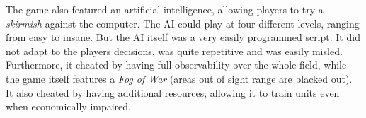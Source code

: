 The game also featured an artificial intelligence, allowing players to try a \emph{skirmish} against the computer. The AI could play at four different levels, ranging from easy to insane. But the AI itself was a very easily programmed script. It did not adapt to the players decisions, was quite repetitive and was easily misled. Furthermore, it cheated by having full observability over the whole field, while the game itself features a \emph{Fog of War} (areas out of sight range are blacked out). It also cheated by having additional resources, allowing it to train units even when economically impaired.


